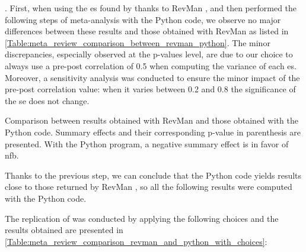 .
First, when using the \gls{es} found by \citet{Cortese2016} thanks to RevMan \citep{RevMan}, and then performed the following steps 
of meta-analysis with the Python code, we observe no major differences between these results and those obtained with RevMan \citep{RevMan} 
as listed in \cref{Table:meta_review_comparison_between_revman_python}. The minor discrepancies, especially observed at the p-values level,
 are due to our choice to always use a pre-post correlation of 0.5 when computing the variance of each \gls{es}. Moreover, a sensitivity 
analysis was conducted to ensure the minor impact of the pre-post correlation value: when it varies between 0.2 and 0.8 the significance 
of the \gls{se} does not change. 

\begin{table}[h!]
  \centering
  \caption{Comparison between \citet{Cortese2016} results obtained with RevMan \citep{RevMan} and those obtained with the Python code. Summary 
	effects and their corresponding p-value in parenthesis are presented. With the Python program, a negative summary effect is in favor of \gls{nfb}.}

  \label{Table:meta_review_comparison_between_revman_python}
\end{table}

Thanks to the previous step, we can conclude that the Python code yields results close to those returned by RevMan \citet{RevMan}, so all 
the following results were computed with the Python code. 

The replication of \citet{Cortese2016} was conducted by applying the following choices and the results obtained are presented 
in \cref{Table:meta_review_comparison_revman_and_python_with_choices}:

